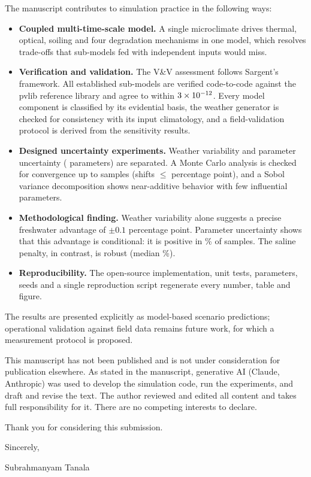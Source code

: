\documentclass[11pt]{article}
\begin{document}
The manuscript contributes to simulation practice in the following ways:
\begin{itemize}
\item \textbf{Coupled multi-time-scale model.} A single microclimate drives thermal, optical, soiling and four
degradation mechanisms in one model, which resolves trade-offs that sub-models fed with independent inputs would miss.
\item \textbf{Verification and validation.} The V\&V assessment follows Sargent's framework. All established sub-models
are verified code-to-code against the pvlib reference library and agree to within $3\times10^{-12}$. Every model component
is classified by its evidential basis, the weather generator is checked for consistency with its input climatology, and
a field-validation protocol is derived from the sensitivity results.
\item \textbf{Designed uncertainty experiments.} Weather variability and parameter uncertainty (\NParams{} parameters)
are separated. A Monte Carlo analysis is checked for convergence up to \NMCConv{} samples (shifts $\le$\ConvMaxShift{}
percentage point), and a Sobol variance decomposition shows near-additive behavior with few influential parameters.
\item \textbf{Methodological finding.} Weather variability alone suggests a precise freshwater advantage of
$\pm0.1$ percentage point. Parameter uncertainty shows that this advantage is conditional: it is positive in
\MCLifePosF\% of samples. The saline penalty, in contrast, is robust (median \MCLifeMedS\%).
\item \textbf{Reproducibility.} The open-source implementation, unit tests, parameters, seeds and a single reproduction
script regenerate every number, table and figure.
\end{itemize}

The results are presented explicitly as model-based scenario predictions; operational validation against field data
remains future work, for which a measurement protocol is proposed.

This manuscript has not been published and is not under consideration for publication elsewhere. As stated in the
manuscript, generative AI (Claude, Anthropic) was used to develop the simulation code, run the experiments, and draft and
revise the text. The author reviewed and edited all content and takes full responsibility for it. There are no competing
interests to declare.

Thank you for considering this submission.

Sincerely,

Subrahmanyam Tanala
\end{document}
